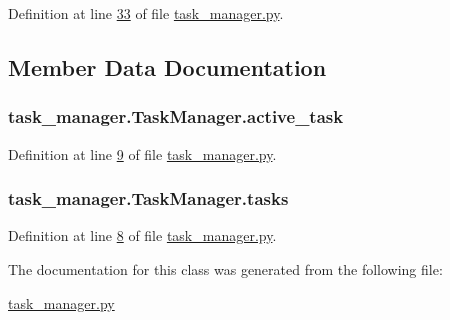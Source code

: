 Definition at line \hyperlink{task__manager_8py_source_l00033}{33} of file \hyperlink{task__manager_8py_source}{task\+\_\+manager.\+py}.



\subsection{Member Data Documentation}
\hypertarget{classtask__manager_1_1TaskManager_a3389ea690b2ade9bfe1efa5ad079b777}{
\subsubsection[{active\+\_\+task}]{\setlength{\rightskip}{0pt plus 5cm}task\+\_\+manager.\+Task\+Manager.\+active\+\_\+task}}\label{classtask__manager_1_1TaskManager_a3389ea690b2ade9bfe1efa5ad079b777}


Definition at line \hyperlink{task__manager_8py_source_l00009}{9} of file \hyperlink{task__manager_8py_source}{task\+\_\+manager.\+py}.

\hypertarget{classtask__manager_1_1TaskManager_a13e69f2bbcef1d7ca03e92235cf9772e}{
\subsubsection[{tasks}]{\setlength{\rightskip}{0pt plus 5cm}task\+\_\+manager.\+Task\+Manager.\+tasks}}\label{classtask__manager_1_1TaskManager_a13e69f2bbcef1d7ca03e92235cf9772e}


Definition at line \hyperlink{task__manager_8py_source_l00008}{8} of file \hyperlink{task__manager_8py_source}{task\+\_\+manager.\+py}.



The documentation for this class was generated from the following file\+:\begin{DoxyCompactItemize}
\item 
\hyperlink{task__manager_8py}{task\+\_\+manager.\+py}\end{DoxyCompactItemize}
